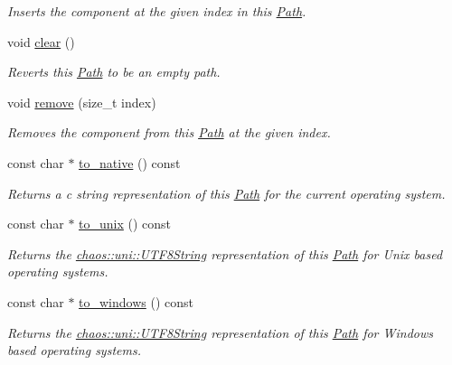 \begin{DoxyCompactItemize}
\begin{DoxyCompactList}\small\item\em Inserts the component at the given index in this \hyperlink{classchaos_1_1io_1_1sys_1_1_path}{Path}. \end{DoxyCompactList}\item 
void \hyperlink{classchaos_1_1io_1_1sys_1_1_path_a7c4cd7e5d8e21a8c522f8a87f1e90f4c}{clear} ()
\begin{DoxyCompactList}\small\item\em Reverts this \hyperlink{classchaos_1_1io_1_1sys_1_1_path}{Path} to be an empty path. \end{DoxyCompactList}\item 
void \hyperlink{classchaos_1_1io_1_1sys_1_1_path_aefc69b11820209acca278104fb230832}{remove} (size\-\_\-t index)
\begin{DoxyCompactList}\small\item\em Removes the component from this \hyperlink{classchaos_1_1io_1_1sys_1_1_path}{Path} at the given index. \end{DoxyCompactList}\item 
const char $\ast$ \hyperlink{classchaos_1_1io_1_1sys_1_1_path_a9528370d2e3ab277a7e71a93469bbc45}{to\-\_\-native} () const 
\begin{DoxyCompactList}\small\item\em Returns a c string representation of this \hyperlink{classchaos_1_1io_1_1sys_1_1_path}{Path} for the current operating system. \end{DoxyCompactList}\item 
const char $\ast$ \hyperlink{classchaos_1_1io_1_1sys_1_1_path_acfc7975266821b34f97ed557b50bd4b5}{to\-\_\-unix} () const 
\begin{DoxyCompactList}\small\item\em Returns the \hyperlink{classchaos_1_1uni_1_1_u_t_f8_string}{chaos\-::uni\-::\-U\-T\-F8\-String} representation of this \hyperlink{classchaos_1_1io_1_1sys_1_1_path}{Path} for Unix based operating systems. \end{DoxyCompactList}\item 
const char $\ast$ \hyperlink{classchaos_1_1io_1_1sys_1_1_path_af36e2ca7305070fbcaa25ed6afa03201}{to\-\_\-windows} () const 
\begin{DoxyCompactList}\small\item\em Returns the \hyperlink{classchaos_1_1uni_1_1_u_t_f8_string}{chaos\-::uni\-::\-U\-T\-F8\-String} representation of this \hyperlink{classchaos_1_1io_1_1sys_1_1_path}{Path} for Windows based operating systems. \end{DoxyCompactList}\item 

\end{DoxyCompactItemize}
